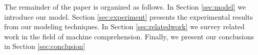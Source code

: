 The remainder of the paper is organized as follows. In Section \ref{sec:model} we introduce our model. Section \ref{sec:experiment} presents the experimental results from our modeling techniques. In Section \ref{sec:relatedwork} we survey related work in the field of machine comprehension. Finally, we present our conclusions in Section \ref{sec:conclusion}

 






